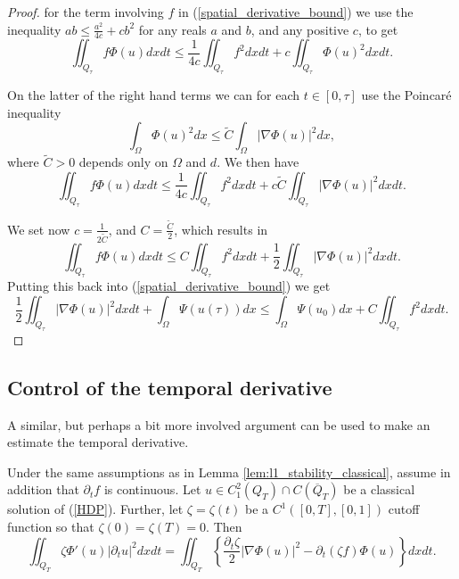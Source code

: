 \documentclass[11pt, a4paper]{article}
\begin{document}
\begin{proof}
for the term involving $f$ in (\ref{spatial_derivative_bound}) we use the inequality $ab \leq \frac{a^2}{4c} + cb^2$ for any reals $a$ and $b$, and any positive $c$, to get
\begin{equation*}
\iint_{Q_\tau}f\Phi(u) dxdt \leq \frac{1}{4c}\iint_{Q_\tau}f^2dxdt + c\iint_{Q_\tau}\Phi(u)^2 dxdt.
\end{equation*}

On the latter of the right hand terms we can for each $t \in [0,\tau]$ use the Poincaré inequality
\begin{equation*}
\int_\Omega \Phi(u)^2 dx \leq \tilde{C}\int_\Omega |\nabla \Phi(u) |^2 dx,
\end{equation*}
where $\tilde{C}>0$ depends only on $\Omega$ and $d$. We then have
\begin{equation*}
\iint_{Q_\tau} f\Phi(u)dxdt \leq \frac{1}{4c}\iint_{Q_\tau}f^2dxdt + c\tilde{C}\iint_{Q_\tau}|\nabla \Phi(u)|^2dxdt. 
\end{equation*}

We set now $c = \frac{1}{2\tilde{C}}$, and $C= \frac{\tilde{C}}{2}$, which results in
\begin{equation*}
\iint_{Q_\tau}f\Phi(u)dxdt \leq C\iint_{Q_\tau}f^2dxdt + \frac{1}{2}\iint_{Q_\tau}|\nabla \Phi(u)|^2dxdt.
\end{equation*}
Putting this back into (\ref{spatial_derivative_bound}) we get
\begin{equation}
\frac{1}{2}\iint_{Q_\tau}|\nabla \Phi(u)|^2dxdt + \int_\Omega \Psi(u(\tau))dx \leq \int_\Omega \Psi(u_0)dx + C\iint_{Q_\tau}f^2dxdt.
\end{equation}
\end{proof}


\subsection{Control of the temporal derivative}
A similar, but perhaps a bit more involved argument can be used to make an estimate the temporal derivative.

\begin{lemma}
\label{lem:temporal_bound_classical}
Under the same assumptions as in Lemma \ref{lem:l1_stability_classical}, assume in addition that $\partial_t f$ is continuous. Let $u\in C^2_1(Q_T) \cap C(\overline{Q}_T)$ be a classical solution of (\ref{HDP}). Further, let $\zeta = \zeta(t)$ be a $C^1([0,T],[0,1])$ cutoff function so that $\zeta(0) = \zeta(T) = 0$. Then
\begin{equation}
\label{temporal_bound_classical}
\iint_{Q_T} \zeta \Phi'(u) |\partial_t u|^2 dxdt = \iint_{Q_T} \left\{ \frac{\partial_t \zeta}{2}|\nabla \Phi(u)|^2 - \partial_t(\zeta f) \Phi(u) \right\} dxdt.
\end{equation}
\end{lemma}
\end{document}
